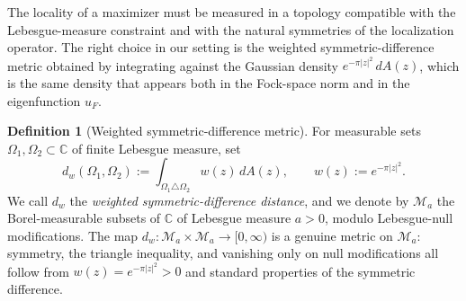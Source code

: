 \documentclass[a4paper,11pt,reqno]{amsart}
\numberwithin{equation}{section}
\theoremstyle{plain} %
\theoremstyle{definition} %
\newtheorem{definition}{Definition}[section]
\theoremstyle{remark}
\newcommand{\C}{\mathbb{C}}
\begin{document}
The locality of a maximizer must be measured in a topology compatible with the
Lebesgue-measure constraint and with the natural symmetries of the localization
operator. The right choice in our setting is the weighted symmetric-difference
metric obtained by integrating against the Gaussian density
\(e^{-\pi|z|^2}\,dA(z)\), which is the same density that appears both in the
Fock-space norm and in the eigenfunction \(u_F\).

\begin{definition}[Weighted symmetric-difference metric]\label{def:weighted-sym-diff}
For measurable sets \(\Omega_1,\Omega_2\subset \C\) of finite Lebesgue measure,
set
\begin{equation}\label{eq:weighted-sym-diff}
d_w(\Omega_1,\Omega_2)
:=
\int_{\Omega_1\triangle\Omega_2} w(z)\,dA(z),
\qquad
w(z):=e^{-\pi |z|^2}.
\end{equation}
We call \(d_w\) the \emph{weighted symmetric-difference distance}, and we denote
by \(\mathcal M_a\) the Borel-measurable subsets of \(\C\) of Lebesgue measure
\(a>0\), modulo Lebesgue-null modifications. The map
\(d_w\colon \mathcal M_a\times \mathcal M_a\to[0,\infty)\) is a genuine metric
on \(\mathcal M_a\): symmetry, the triangle inequality, and vanishing only on
null modifications all follow from \(w(z)=e^{-\pi|z|^2}>0\) and standard
properties of the symmetric difference.
\end{definition}
\end{document}
